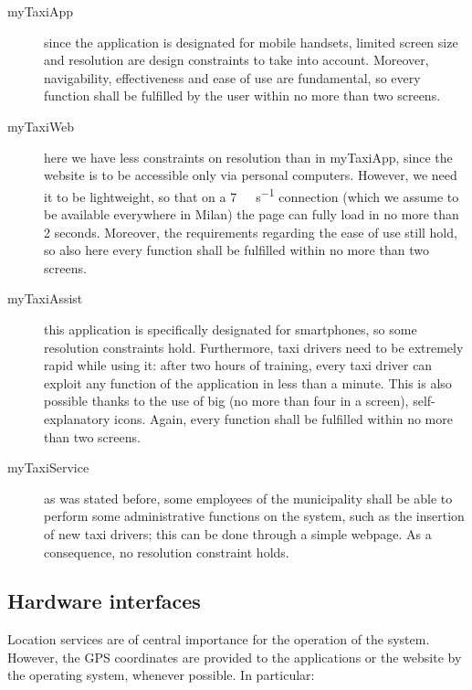 \begin{description}
	
	\item [myTaxiApp] since the application is designated for mobile handsets, limited screen size and resolution are design constraints to take into account. Moreover, navigability, effectiveness and ease of use are fundamental, so every function shall be fulfilled by the user within no more than two screens.
	
	\item [myTaxiWeb] here we have less constraints on resolution than in myTaxiApp, since the website is to be accessible only via personal computers. However, we need it to be lightweight, so that on a \SI[per-mode=symbol]{7}{\mega\bit\per\second} connection (which we assume to be available everywhere in Milan) the page can fully load in no more than 2 seconds. Moreover, the requirements regarding the ease of use still hold, so also here every function shall be fulfilled within no more than two screens.
	
	\item [myTaxiAssist] this application is specifically designated for smartphones, so some resolution constraints hold. Furthermore, taxi drivers need to be extremely rapid while using it: after two hours of training, every taxi driver can exploit any function of the application in less than a minute. This is also possible thanks to the use of big (no more than four in a screen), self-explanatory icons. Again, every function shall be fulfilled within no more than two screens.
	
	\item [myTaxiService] as was stated before, some employees of the municipality shall be able to perform some administrative functions on the system, such as the insertion of new taxi drivers; this can be done through a simple webpage. As a consequence, no resolution constraint holds.

\end{description}


\subsection{Hardware interfaces}%
Location services are of central importance for the operation of the system. However, the GPS coordinates are provided to the applications or the website by the operating system, whenever possible. In particular:

